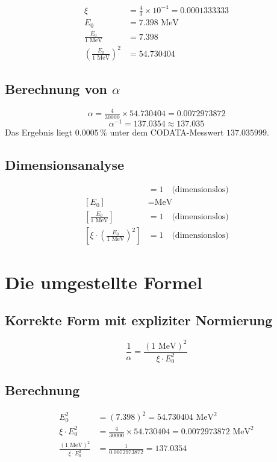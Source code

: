 	\begin{align*}
		\xi &= \frac{4}{3} \times 10^{-4} = 0.0001333333 \\
		E_0 &= 7.398 \text{ MeV} \\
		\frac{E_0}{1 \text{ MeV}} &= 7.398 \\
		\left(\frac{E_0}{1 \text{ MeV}}\right)^2 &= 54.730404
	\end{align*}
	
	\subsection*{Berechnung von $\alpha$}
	
	\[
	\alpha = \tfrac{4}{30000} \times 54.730404 = 0.0072973872
	\]
	\[
	\alpha^{-1} = 137.0354 \approx 137.035
	\]
	Das Ergebnis liegt $0.0005\,\%$ unter dem CODATA-Messwert $137.035999$.

	
	\subsection*{Dimensionsanalyse}
	
	\begin{align*}
		[\xi] &= 1 \quad \text{(dimensionslos)} \\
		[E_0] &= \text{MeV} \\
		\left[\frac{E_0}{1 \text{ MeV}}\right] &= 1 \quad \text{(dimensionslos)} \\
		\left[\xi \cdot \left(\frac{E_0}{1 \text{ MeV}}\right)^2\right] &= 1 \quad \text{(dimensionslos)}
	\end{align*}
	
	\section*{Die umgestellte Formel}
	
	\subsection*{Korrekte Form mit expliziter Normierung}
	
	\[
	\boxed{\frac{1}{\alpha} = \frac{(1 \text{ MeV})^2}{\xi \cdot E_0^2}}
	\]
	
	\subsection*{Berechnung}
	
	\begin{align*}
		E_0^2 &= (7.398)^2 = 54.730404 \text{ MeV}^2 \\
		\xi \cdot E_0^2 &= \tfrac{4}{30000} \times 54.730404 = 0.0072973872 \text{ MeV}^2 \\
		\frac{(1 \text{ MeV})^2}{\xi \cdot E_0^2} &= \frac{1}{0.0072973872} = 137.0354
	\end{align*}
	
